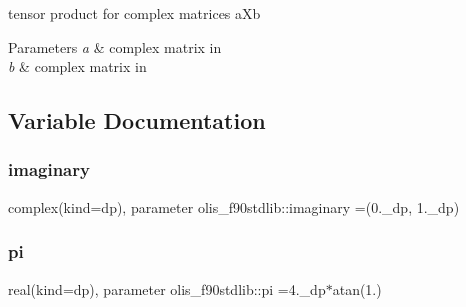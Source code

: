 tensor product for complex matrices a\+Xb 


\begin{DoxyParams}{Parameters}
{\em a} & complex matrix in \\
\hline
{\em b} & complex matrix in \\
\hline
\end{DoxyParams}


\subsection{Variable Documentation}
\mbox{\label{namespaceolis__f90stdlib_a0a22d30625256a14acc49cd749e88cb7}} 
\subsubsection{\texorpdfstring{imaginary}{imaginary}}
{\footnotesize\ttfamily complex(kind=dp), parameter olis\+\_\+f90stdlib\+::imaginary =(0.\+\_\+dp, 1.\+\_\+dp)}

\mbox{\label{namespaceolis__f90stdlib_a106e09303fbf05972f0635ff67f73c9d}} 
\subsubsection{\texorpdfstring{pi}{pi}}
{\footnotesize\ttfamily real(kind=dp), parameter olis\+\_\+f90stdlib\+::pi =4.\+\_\+dp$\ast$atan(1.)}

